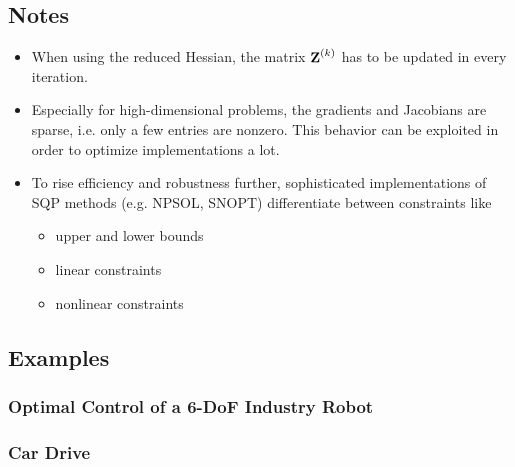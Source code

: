 		\subsection{Notes}
			\begin{itemize}
				\item When using the reduced Hessian, the matrix \( \bm{\mathrm{Z}}^{(k)} \) has to be updated in every iteration.
				\item Especially for high-dimensional problems, the gradients and Jacobians are sparse, i.e. only a few entries are nonzero. This behavior can be exploited in order to optimize implementations a lot.
				\item To rise efficiency and robustness further, sophisticated implementations of SQP methods (e.g. NPSOL, SNOPT) differentiate between constraints like
					\begin{itemize}
						\item upper and lower bounds
						\item linear constraints
						\item nonlinear constraints
					\end{itemize}
			\end{itemize}

		\subsection{Examples} %

			\subsubsection{Optimal Control of a 6-DoF Industry Robot} %

			\subsubsection{Car Drive} %

